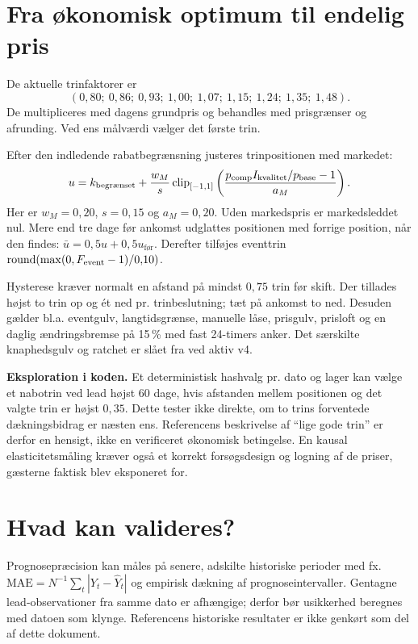 \documentclass[11pt,a4paper]{article}
\newcommand{\clip}{\operatorname{clip}}\newcommand{\pos}[1]{\left[#1\right]_+}
\newcommand{\code}[1]{\texttt{\small\detokenize{#1}}}
\begin{document}
\newpage
\section{Fra økonomisk optimum til endelig pris}
De aktuelle trinfaktorer er
\[
(0{,}80;\ 0{,}86;\ 0{,}93;\ 1{,}00;\ 1{,}07;\ 1{,}15;\ 1{,}24;\ 1{,}35;\ 1{,}48).
\]
De multipliceres med dagens grundpris og behandles med prisgrænser og
afrunding. Ved ens målværdi vælger \code{choose_rung} det første trin.

Efter den indledende rabatbegrænsning justeres trinpositionen med markedet:
\begin{equation}
u=k_{\text{begrænset}}+\frac{w_M}{s}\clip_{[-1,1]}
\left(\frac{p_{\rm comp}I_{\rm kvalitet}/p_{\rm base}-1}{a_M}\right).
\end{equation}
Her er $w_M=0{,}20$, $s=0{,}15$ og $a_M=0{,}20$. Uden markedspris er
markedsleddet nul. Mere end tre dage før ankomst udglattes positionen med
forrige position, når den findes: $\bar u=0{,}5u+0{,}5u_{\text{før}}$.
Derefter tilføjes eventtrin $\operatorname{round}(\max(0,F_{\rm event}-1)/0{,}10)$.

Hysterese kræver normalt en afstand på mindst $0{,}75$ trin før skift.
Der tillades højst to trin op og ét ned pr. trinbeslutning; tæt på ankomst to
ned. Desuden gælder bl.a. eventgulv, langtidsgrænse, manuelle låse, prisgulv,
prisloft og en daglig ændringsbremse på 15\,\% med fast 24-timers anker.
Det særskilte knaphedsgulv og ratchet er slået fra ved aktiv v4.

\textbf{Eksploration i koden.} Et deterministisk hashvalg pr. dato og lager kan
vælge et nabotrin ved lead højst 60 dage, hvis afstanden mellem positionen og
det valgte trin er højst $0{,}35$. Dette tester ikke direkte, om to trins
forventede dækningsbidrag er næsten ens. Referencens beskrivelse af ``lige
gode trin'' er derfor en hensigt, ikke en verificeret økonomisk betingelse.
En kausal elasticitetsmåling kræver også et korrekt forsøgsdesign og logning af
de priser, gæsterne faktisk blev eksponeret for.

\section{Hvad kan valideres?}
Prognosepræcision kan måles på senere, adskilte historiske perioder med fx.
$\mathrm{MAE}=N^{-1}\sum_t|Y_t-\widehat Y_t|$ og empirisk dækning af
prognoseintervaller. Gentagne lead-observationer fra samme dato er afhængige;
derfor bør usikkerhed beregnes med datoen som klynge. Referencens historiske
resultater er ikke genkørt som del af dette dokument.
\end{document}
